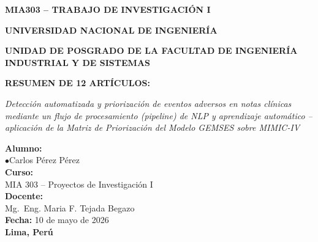 \documentclass[11pt,a4paper]{article}
\begin{document}

\begin{titlepage}
\centering
\vspace*{1.5cm}
{\large\bfseries MIA303 -- TRABAJO DE INVESTIGACIÓN I\par}
\vspace{0.3cm}
{\large\bfseries UNIVERSIDAD NACIONAL DE INGENIERÍA\par}
\vspace{0.3cm}
{\normalsize\bfseries UNIDAD DE POSGRADO DE LA FACULTAD DE INGENIERÍA INDUSTRIAL Y DE SISTEMAS\par}

\vspace{2.5cm}

{\Large\bfseries\color{navy} RESUMEN DE 12 ARTÍCULOS:\par}
\vspace{0.4cm}
{\large\itshape Detección automatizada y priorización de eventos adversos en notas clínicas mediante un flujo de procesamiento (\textit{pipeline}) de NLP y aprendizaje automático -- aplicación de la Matriz de Priorización del Modelo GEMSES sobre MIMIC-IV\par}

\vspace{2cm}

\begin{flushleft}
\textbf{Alumno:}\\[2pt]
\quad $\bullet$\quad Carlos Pérez Pérez\\[18pt]

\textbf{Curso:}\\[2pt]
\quad MIA 303 -- Proyectos de Investigación I\\[10pt]

\textbf{Docente:}\\[2pt]
\quad Mg.~Eng. Maria F. Tejada Begazo\\[18pt]

\textbf{Fecha:} 10 de mayo de 2026\\[18pt]

\textbf{Lima, Perú}
\end{flushleft}

\vfill
\end{titlepage}

\tableofcontents
\newpage

\end{document}
